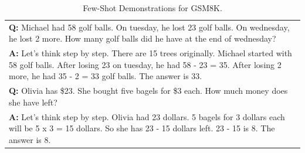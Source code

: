 \documentclass[11pt]{article}
\begin{document}
\begin{table}[ht]
\begin{tabularx}{\textwidth}{X}
    \hdashline
    \textbf{Q: }Michael had 58 golf balls. On tuesday, he lost 23 golf balls. On wednesday, he lost 2 more. How many golf balls did he have at the end of wednesday? \\
    \textbf{A: }Let's think step by step. There are 15 trees originally. Michael started with 58 golf balls. After losing 23 on tuesday, he had 58 - 23 = 35. After losing 2 more, he had 35 - 2 = 33 golf balls. The answer is 33.\\
    \hdashline
    \textbf{Q: }Olivia has \$23. She bought five bagels for \$3 each. How much money does she have left? \\
    \textbf{A: }Let's think step by step. Olivia had 23 dollars. 5 bagels for 3 dollars each will be 5 x 3 = 15 dollars. So she has 23 - 15 dollars left. 23 - 15 is 8. The answer is 8.\\
    \bottomrule
    \end{tabularx}
    \caption{Few-Shot Demonstrations for GSM8K.}
    \label{tab:fs_gsm8k}
\end{table}
\end{document}
